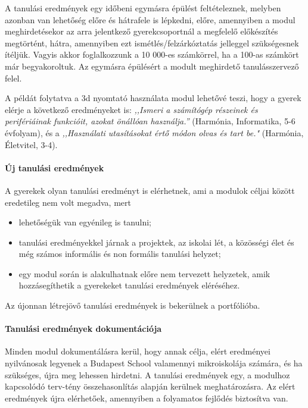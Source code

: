 A tanulási eredmények egy időbeni egymásra épülést feltételeznek,
melyben azonban van lehetőség előre és hátrafele is lépkedni, előre,
amennyiben a modul meghirdetésekor az arra jelentkező gyerekcsoportnál a
megfelelő előkészítés megtörtént, hátra, amennyiben ezt
ismétlés/felzárkóztatás jelleggel szükségesnek ítéljük. Vagyis akkor
foglalkozzunk a 10 000-es számkörrel, ha a 100-as számkört már
begyakoroltuk. Az egymásra épülésért a modult meghirdető tanulásszervező
felel.

A példát folytatva a 3d nyomtató használata modul lehetővé teszi, hogy a
gyerek elérje a következő eredményeket is: \emph{,,Ismeri a számítógép
  részeinek és perifériáinak funkcióit, azokat önállóan használja.''}
(Harmónia, Informatika, 5-6 évfolyam), és a \emph{,,Használati utasításokat
  értő módon olvas és tart be."} (Harmónia, Életvitel, 3-4).

\paragraph{Új tanulási eredmények}

A gyerekek olyan tanulási eredményt is elérhetnek, ami a modulok céljai
között eredetileg nem volt megadva, mert

\begin{itemize}
  \item lehetőségük van egyénileg is tanulni;

  \item tanulási eredményekkel járnak a projektek, az iskolai lét, a közösségi
        élet és még számos informális és non formális tanulási helyzet;

  \item egy modul során is alakulhatnak előre nem tervezett helyzetek, amik
        hozzásegíthetik a gyerekeket tanulási eredmények eléréséhez.
\end{itemize}

Az újonnan létrejövő tanulási eredmények is bekerülnek a portfólióba.

\paragraph{Tanulási eredmények dokumentációja}

Minden modul dokumentálásra kerül, hogy annak célja, elért eredményei
nyilvánosak legyenek a Budapest School valamennyi mikroiskolája számára,
és ha szükséges, újra meg lehessen hirdetni. A tanulási eredmények egy,
a modulhoz kapcsolódó terv-tény összehasonlítás alapján kerülnek
meghatározásra. Az elért eredmények újra elérhetőek, amennyiben a
folyamatos fejlődés biztosítva van.

